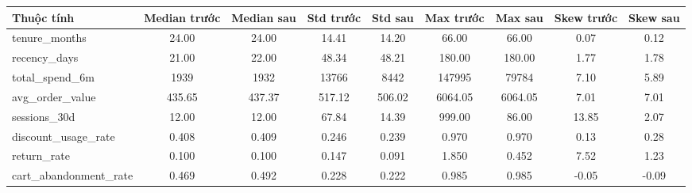 \begin{tabular}{lcccccccc}
\toprule
Thuộc tính & Median trước & Median sau & Std trước & Std sau & Max trước & Max sau & Skew trước & Skew sau \\
\midrule
tenure\_months & 24.00 & 24.00 & 14.41 & 14.20 & 66.00 & 66.00 & 0.07 & 0.12 \\
recency\_days & 21.00 & 22.00 & 48.34 & 48.21 & 180.00 & 180.00 & 1.77 & 1.78 \\
total\_spend\_6m & 1939 & 1932 & 13766 & 8442 & 147995 & 79784 & 7.10 & 5.89 \\
avg\_order\_value & 435.65 & 437.37 & 517.12 & 506.02 & 6064.05 & 6064.05 & 7.01 & 7.01 \\
sessions\_30d & 12.00 & 12.00 & 67.84 & 14.39 & 999.00 & 86.00 & 13.85 & 2.07 \\
discount\_usage\_rate & 0.408 & 0.409 & 0.246 & 0.239 & 0.970 & 0.970 & 0.13 & 0.28 \\
return\_rate & 0.100 & 0.100 & 0.147 & 0.091 & 1.850 & 0.452 & 7.52 & 1.23 \\
cart\_abandonment\_rate & 0.469 & 0.492 & 0.228 & 0.222 & 0.985 & 0.985 & -0.05 & -0.09 \\
\bottomrule
\end{tabular}
